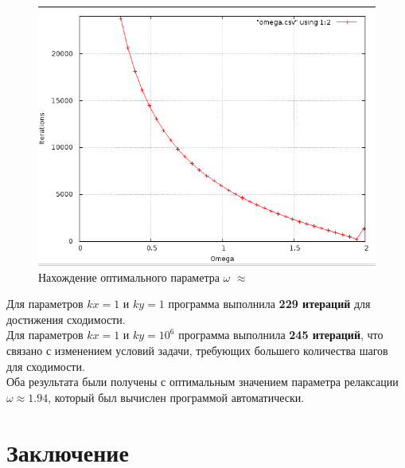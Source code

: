 \documentclass[a4paper, fleqn]{report}
\begin{document}
\begin{figure}[h]
    \centering
    \begin{minipage}{0.7\textwidth}
        \centering
        \includegraphics[width=\textwidth]{media/omega.png}
        \caption{Нахождение оптимального параметра \(\omega\) \(\approx\)}
        \label{fig:omega_1_1}
    \end{minipage}%
\end{figure}
Для параметров \(kx = 1\) и \(ky = 1\) программа выполнила \textbf{229 итераций} для достижения сходимости. \\
Для параметров \(kx = 1\) и \(ky = 10^6\) программа выполнила \textbf{245 итераций}, что связано с изменением условий задачи, требующих большего количества шагов для сходимости. \\
Оба результата были получены с оптимальным значением параметра релаксации \textbf{\( \omega \approx 1.94 \)}, который был вычислен программой автоматически.


\chapter*{Заключение}
\end{document}
